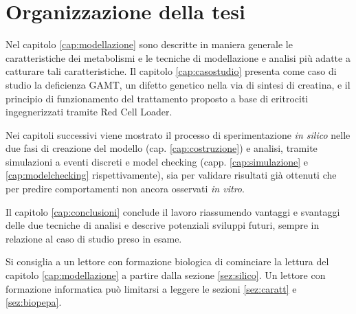 	\section{Organizzazione della tesi}
	Nel capitolo \ref{cap:modellazione} sono descritte in maniera generale le caratteristiche dei metabolismi e le tecniche di modellazione e analisi pi\`u adatte a catturare tali caratteristiche. Il capitolo \ref{cap:casostudio} presenta come caso di studio la deficienza GAMT, un difetto genetico nella via di sintesi di creatina, e il principio di funzionamento del trattamento proposto a base di eritrociti ingegnerizzati tramite Red Cell Loader.
	
	Nei capitoli successivi viene mostrato il processo di sperimentazione \emph{in silico} nelle due fasi di creazione del modello (cap. \ref{cap:costruzione}) e analisi, tramite simulazioni a eventi discreti e model checking (capp. \ref{cap:simulazione} e \ref{cap:modelchecking} rispettivamente), sia per validare risultati gi\`a ottenuti che per predire comportamenti non ancora osservati \emph{in vitro}.
	
	Il capitolo \ref{cap:conclusioni} conclude il lavoro riassumendo vantaggi e svantaggi delle due tecniche di analisi e descrive potenziali sviluppi futuri, sempre in relazione al caso di studio preso in esame.
	
	Si consiglia a un lettore con formazione biologica di cominciare la lettura del capitolo \ref{cap:modellazione} a partire dalla sezione \ref{sez:silico}.
	Un lettore con formazione informatica pu\`o limitarsi a leggere le sezioni \ref{sez:caratt} e \ref{sez:biopepa}.